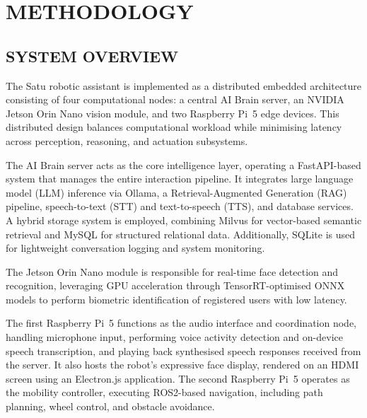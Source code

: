 \chapter{METHODOLOGY}

\section{SYSTEM OVERVIEW}

The Satu robotic assistant is implemented as a distributed embedded architecture consisting of four computational nodes: a central AI Brain server, an NVIDIA Jetson Orin Nano vision module, and two Raspberry Pi~5 edge devices. This distributed design balances computational workload while minimising latency across perception, reasoning, and actuation subsystems.

The AI Brain server acts as the core intelligence layer, operating a FastAPI-based system that manages the entire interaction pipeline. It integrates large language model (LLM) inference via Ollama, a Retrieval-Augmented Generation (RAG) pipeline, speech-to-text (STT) and text-to-speech (TTS), and database services. A hybrid storage system is employed, combining Milvus for vector-based semantic retrieval and MySQL for structured relational data. Additionally, SQLite is used for lightweight conversation logging and system monitoring.

The Jetson Orin Nano module is responsible for real-time face detection and recognition, leveraging GPU acceleration through TensorRT-optimised ONNX models to perform biometric identification of registered users with low latency.

The first Raspberry Pi~5 functions as the audio interface and coordination node, handling microphone input, performing voice activity detection and on-device speech transcription, and playing back synthesised speech responses received from the server. It also hosts the robot's expressive face display, rendered on an HDMI screen using an Electron.js application. The second Raspberry Pi~5 operates as the mobility controller, executing ROS2-based navigation, including path planning, wheel control, and obstacle avoidance.

